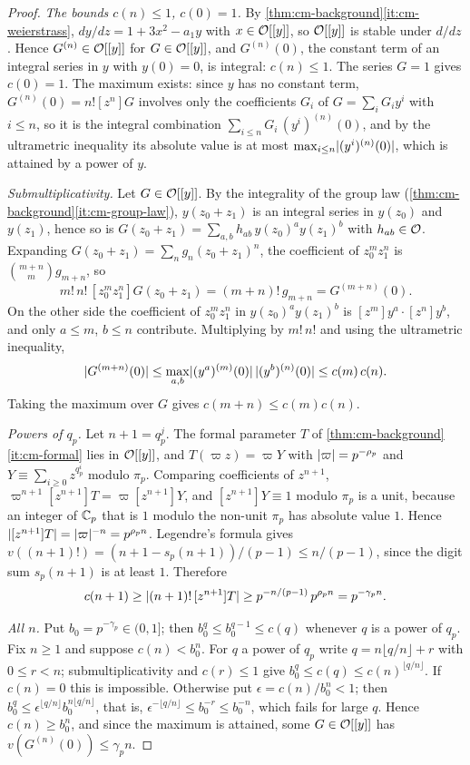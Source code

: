 \begin{proof}
\emph{The bounds $c(n)\le1$, $c(0)=1$.} By \cref{thm:cm-background}\ref{it:cm-weierstrass}, $dy/dz=1+3x^2-a_1y$ with $x\in\mathcal{O}[[y]]$, so $\mathcal{O}[[y]]$ is stable under $d/dz$. Hence $G^{(n)}\in\mathcal{O}[[y]]$ for $G\in\mathcal{O}[[y]]$, and $G^{(n)}(0)$, the constant term of an integral series in $y$ with $y(0)=0$, is integral: $c(n)\le1$. The series $G=1$ gives $c(0)=1$. The maximum exists: since $y$ has no constant term, $G^{(n)}(0)=n![z^n]G$ involves only the coefficients $G_i$ of $G=\sum_iG_iy^i$ with $i\le n$, so it is the integral combination $\sum_{i\le n}G_i\,(y^i)^{(n)}(0)$, and by the ultrametric inequality its absolute value is at most $\max_{i\le n}\lvert (y^i)^{(n)}(0)\rvert$, which is attained by a power of $y$.

\emph{Submultiplicativity.} Let $G\in\mathcal{O}[[y]]$. By the integrality of the group law (\cref{thm:cm-background}\ref{it:cm-group-law}), $y(z_0+z_1)$ is an integral series in $y(z_0)$ and $y(z_1)$, hence so is $G(z_0+z_1)=\sum_{a,b}h_{ab}\,y(z_0)^ay(z_1)^b$ with $h_{ab}\in\mathcal{O}$. Expanding $G(z_0+z_1)=\sum_ng_n(z_0+z_1)^n$, the coefficient of $z_0^mz_1^n$ is $\binom{m+n}m g_{m+n}$, so
\[
  m!\,n!\,[z_0^mz_1^n]G(z_0+z_1)=(m+n)!\,g_{m+n}=G^{(m+n)}(0).
\]
On the other side the coefficient of $z_0^mz_1^n$ in $y(z_0)^ay(z_1)^b$ is $[z^m]y^a\cdot[z^n]y^b$, and only $a\le m$, $b\le n$ contribute. Multiplying by $m!\,n!$ and using the ultrametric inequality,
\[
  \lvert G^{(m+n)}(0)\rvert\le\max_{a,b}\lvert (y^a)^{(m)}(0)\rvert\,\lvert (y^b)^{(n)}(0)\rvert\le c(m)\,c(n).
\]
Taking the maximum over $G$ gives $c(m+n)\le c(m)c(n)$.

\emph{Powers of $q_p$.} Let $n+1=q_p^j$. The formal parameter $T$ of \cref{thm:cm-background}\ref{it:cm-formal} lies in $\mathcal{O}[[y]]$, and $T(\varpi z)=\varpi Y$ with $\lvert \varpi\rvert=p^{-\rho_p}$ and $Y\equiv\sum_{i\ge0}z^{q_p^i}$ modulo $\pi_p$. Comparing coefficients of $z^{n+1}$, $\varpi^{n+1}[z^{n+1}]T=\varpi[z^{n+1}]Y$, and $[z^{n+1}]Y\equiv1$ modulo $\pi_p$ is a unit, because an integer of $\mathbb{C}_p$ that is $1$ modulo the non-unit $\pi_p$ has absolute value $1$. Hence $\lvert [z^{n+1}]T\rvert=\lvert \varpi\rvert^{-n}=p^{\rho_pn}$. Legendre's formula gives $v((n+1)!)=(n+1-s_p(n+1))/(p-1)\le n/(p-1)$, since the digit sum $s_p(n+1)$ is at least $1$. Therefore
\[
  c(n+1)\ge\lvert (n+1)!\,[z^{n+1}]T\rvert\ge p^{-n/(p-1)}\,p^{\rho_pn}=p^{-\gamma_pn}.
\]

\emph{All $n$.} Put $b_0=p^{-\gamma_p}\in(0,1]$; then $b_0^{q}\le b_0^{q-1}\le c(q)$ whenever $q$ is a power of $q_p$. Fix $n\ge1$ and suppose $c(n)<b_0^n$. For $q$ a power of $q_p$ write $q=n\lfloor q/n\rfloor+r$ with $0\le r<n$; submultiplicativity and $c(r)\le1$ give $b_0^q\le c(q)\le c(n)^{\lfloor q/n\rfloor}$. If $c(n)=0$ this is impossible. Otherwise put $\epsilon=c(n)/b_0^n<1$; then $b_0^q\le\epsilon^{\lfloor q/n\rfloor}b_0^{n\lfloor q/n\rfloor}$, that is, $\epsilon^{-\lfloor q/n\rfloor}\le b_0^{-r}\le b_0^{-n}$, which fails for large $q$. Hence $c(n)\ge b_0^n$, and since the maximum is attained, some $G\in\mathcal{O}[[y]]$ has $v(G^{(n)}(0))\le\gamma_pn$.
\end{proof}

